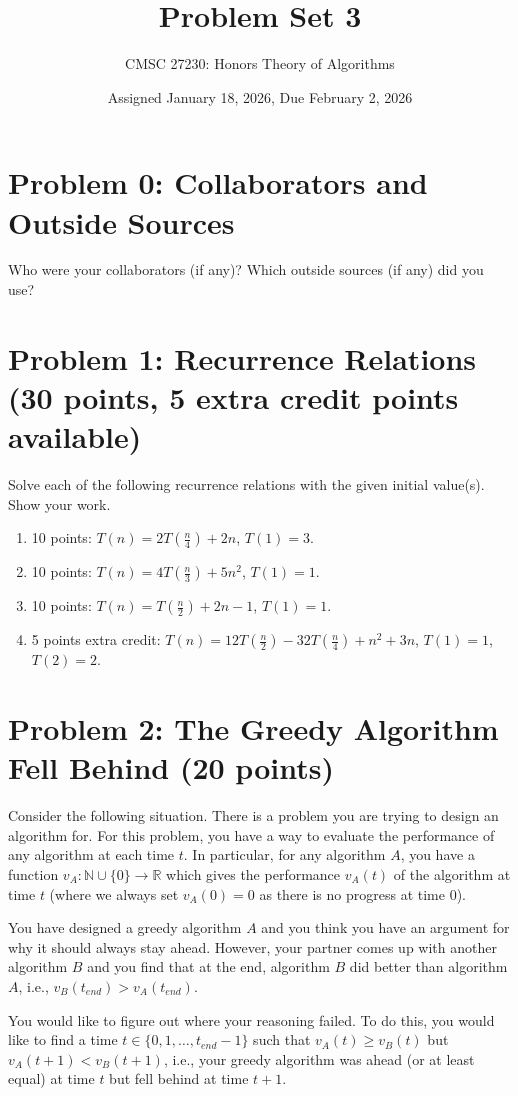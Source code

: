 \documentclass[12pt]{article}
\title{Problem Set 3}
\author{CMSC 27230: Honors Theory of Algorithms}
\date{Assigned January 18, 2026, Due February 2, 2026}
\begin{document}
\maketitle

\thispagestyle{empty}
\section*{Problem 0: Collaborators and Outside Sources}
Who were your collaborators (if any)? Which outside sources (if any) did you use?
\section*{Problem 1: Recurrence Relations (30 points, 5 extra credit points available)}
Solve each of the following recurrence relations with the given initial value(s). Show your work.
\begin{enumerate}
\item[(a)] 10 points: $T(n) = 2T(\frac{n}{4}) + 2n$, $T(1) = 3$.
\item[(b)] 10 points: $T(n) = 4T(\frac{n}{3}) + 5n^2$, $T(1) = 1$.
\item[(c)] 10 points: $T(n) = T(\frac{n}{2}) + 2n - 1$, $T(1) = 1$.
\item[(d)] 5 points extra credit: $T(n) = 12T(\frac{n}{2}) - 32T(\frac{n}{4}) + n^2 + 3n$, $T(1) = 1$, $T(2) = 2$.
\end{enumerate}
\section*{Problem 2: The Greedy Algorithm Fell Behind (20 points)}
Consider the following situation. There is a problem you are trying to design an algorithm for. For this problem, you have a way to evaluate the performance of any algorithm at each time $t$. In particular, for any algorithm $A$, you have a function $v_A: \mathbb{N} \cup \{0\} \to \mathbb{R}$ which gives the performance $v_A(t)$ of the algorithm at time $t$ (where we always set $v_A(0) = 0$ as there is no progress at time $0$). 

You have designed a greedy algorithm $A$ and you think you have an argument for why it should always stay ahead. However, your partner comes up with another algorithm $B$ and you find that at the end, algorithm $B$ did better than algorithm $A$, i.e., $v_{B}(t_{end}) > v_{A}(t_{end})$. 

You would like to figure out where your reasoning failed. To do this, you would like to find a time $t \in \{0,1,\ldots,t_{end}-1\}$ such that $v_{A}(t) \geq v_{B}(t)$ but $v_{A}(t+1) < v_{B}(t+1)$, i.e., your greedy algorithm was ahead (or at least equal) at time $t$ but fell behind at time $t+1$.
\end{document}
